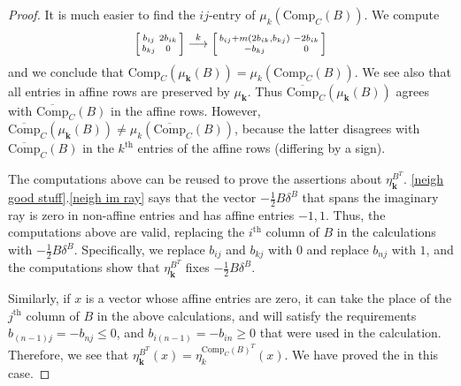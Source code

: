 \documentclass{amsart}
\theoremstyle{definition}
\theoremstyle{remark}
\numberwithin{equation}{section}
\newcommand{\set}[1]{{\lbrace #1 \rbrace}}
\renewcommand{\th}{^\text{th}}
\newcommand{\0}{{\mathbf{0}}}
\newcommand{\Comp}{\mathrm{Comp}_C}
\newcommand{\CompPlus}{\overline{\mathrm{Comp}}_C}
\newcommand{\kk}{{\boldsymbol{k}}}
\renewcommand{\th}{^\text{th}}
\begin{document}
\begin{proof}
It is much easier to find the $ij$-entry of $\mu_k(\Comp(B))$.
We compute
\[
\begin{bsmallmatrix*}
b_{ij}&2b_{ik}\\
b_{kj}&0
\end{bsmallmatrix*}
\overset{k}{\longrightarrow}
\begin{bsmallmatrix*}
b_{ij}+m(2b_{ik},b_{kj})&-2b_{ik}\\
-b_{kj}&0
\end{bsmallmatrix*}
\]
and we conclude that $\Comp(\mu_\kk(B))=\mu_k(\Comp(B))$.
We see also that all entries in affine rows are preserved by $\mu_\kk$.
Thus $\CompPlus(\mu_\kk(B))$ agrees with $\CompPlus(B)$ in the affine rows.
However, $\CompPlus(\mu_\kk(B))\neq\mu_k(\CompPlus(B))$, because the latter disagrees with $\CompPlus(B)$ in the $k\th$ entries of the affine rows (differing by a sign).

The computations above can be reused to prove the assertions about $\eta^{B^T}_\kk$.
\cref{neigh good stuff}.\ref{neigh im ray} says that the vector $-\frac12B\delta^B$ that spans the imaginary ray is zero in non-affine entries and has affine entries $-1,1$.
Thus, the computations above are valid, replacing the $i\th$ column of $B$ in the calculations with $-\frac12B\delta^B$.
Specifically, we replace $b_{ij}$ and $b_{kj}$ with $0$ and replace $b_{nj}$ with $1$, and the computations show that $\eta^{B^T}_\kk$ fixes $-\frac12B\delta^B$.

Similarly, if $x$ is a vector whose affine entries are zero, it can take the place of the $j\th$ column of $B$ in the above calculations, and will satisfy the requirements $b_{(n-1)j}=-b_{nj}\le0$, and $b_{i(n-1)}=-b_{in}\ge0$ that were used in the calculation.  
Therefore, we see that $\eta^{B^T}_\kk(x)=\eta^{\Comp(B)^T}_k(x)$.
We have proved the  in this case.

\medskip


\end{proof}
\end{document}
